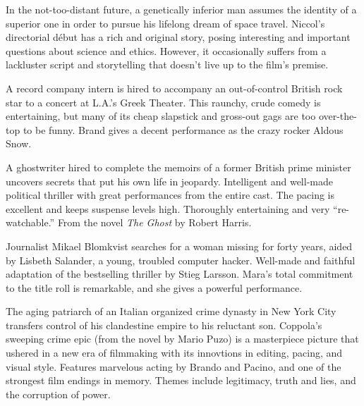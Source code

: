    In the not-too-distant future, a genetically inferior man assumes the identity of a superior one in order to pursue his lifelong dream of space travel. Niccol's directorial d\'ebut has a rich and original story, posing interesting and important questions about science and ethics. However, it occasionally suffers from a lackluster script and storytelling that doesn't live up to the film's premise. \author{DW} 

   A record company intern is hired to accompany an out-of-control British rock star to a concert at L.A.'s Greek Theater. This raunchy, crude comedy is entertaining, but many of its cheap slapstick and gross-out gags are too over-the-top to be funny. Brand gives a decent performance as the crazy rocker Aldous Snow. \author{DW} 

   A ghostwriter hired to complete the memoirs of a former British prime minister uncovers secrets that put his own life in jeopardy. Intelligent and well-made political thriller with great performances from the entire cast. The pacing is excellent and keeps suspense levels high. Thoroughly entertaining and very ``re-watchable.'' From the novel \textit{The Ghost} by Robert Harris. \author{DW} 

   Journalist Mikael Blomkvist searches for a woman missing for forty years, aided by Lisbeth Salander, a young, troubled computer hacker. Well-made and faithful adaptation of the bestselling thriller by Stieg Larsson. Mara's total commitment to the title roll is remarkable, and she gives a powerful performance. \author{DW} 

   The aging patriarch of an Italian organized crime dynasty in New York City transfers control of his clandestine empire to his reluctant son. Coppola's sweeping crime epic (from the novel by Mario Puzo) is a masterpiece picture that ushered in a new era of filmmaking with its innovtions in editing, pacing, and visual style. Features marvelous acting by Brando and Pacino, and one of the strongest film endings in memory. Themes include legitimacy, truth and lies, and the corruption of power. \author{DW} 


